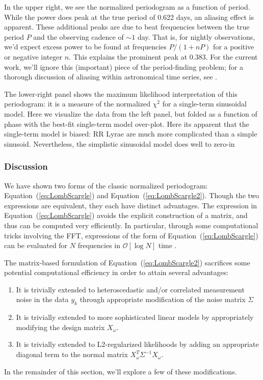 \documentclass[12pt,preprint]{aastex}
\newcommand{\Eq}[1]{Equation~(\ref{eq:#1})}
\newcommand{\eq}[1]{\Eq{#1}}
\begin{document}
In the upper right, we see the normalized periodogram as a function of period. While the power does peak at the true period of 0.622 days, an aliasing effect is apparent. These additional peaks are due to beat frequencies between the true period $P$ and the observing cadence of $\sim 1$ day. That is, for nightly observations, we'd expect excess power to be found at frequencies $P / (1 + nP)$ for a positive or negative integer $n$. This explains the prominent peak at $0.383$. For the current work, we'll ignore this (important) piece of the period-finding problem; for a thorough discussion of aliasing within astronomical time series, see \citet{Roberts87}.

The lower-right panel shows the maximum likelihood interpretation of this periodogram: it is a measure of the normalized $\chi^2$ for a single-term sinusoidal model. Here we visualize the data from the left panel, but folded as a function of phase with the best-fit single-term model over-plot. Here its apparent that the single-term model is biased: RR Lyrae are much more complicated than a simple sinusoid. Nevertheless, the simplistic sinusoidal model does well to zero-in

\subsubsection{Discussion}
We have shown two forms of the classic normalized periodogram: \eq{LombScargle} and \eq{LombScargle2}. Though the two expressions are equivalent, they each have distinct advantages. The expression in \eq{LombScargle} avoids the explicit construction of a matrix, and thus can be computed very efficiently. In particular, through some computational tricks involving the FFT, expressions of the form of \eq{LombScargle} can be evaluated for $N$ frequencies in $\mathcal{O}[\log{N}]$ time \citep{Press89}.

The matrix-based formulation of \eq{LombScargle2} sacrifices some potential computational efficiency in order to attain several advantages:
\begin{enumerate}
  \item It is trivially extended to heteroscedastic and/or correlated measurement noise in the data $y_k$ through appropriate modification of the noise matrix $\Sigma$
  \item It is trivially extended to more sophisticated linear models by appropriately modifying the design matrix $X_\omega$.
  \item It is trivially extended to L2-regularized likelihoods by adding an appropriate diagonal term to the normal matrix $X_\omega^T\Sigma^{-1}X_\omega$.
\end{enumerate}
In the remainder of this section, we'll explore a few of these modifications.
\end{document}
